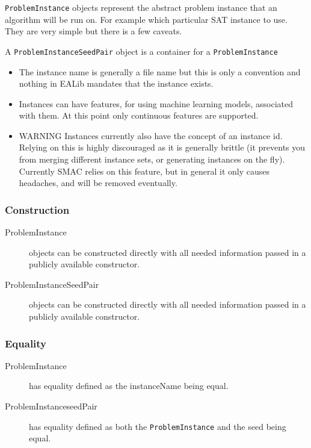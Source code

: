 \documentclass[11pt,letterpaper,oneside]{article}
\begin{document}
\texttt{ProblemInstance} objects represent the abstract problem instance that an algorithm will be run on. For example which particular SAT instance to use. They are very simple but there is a few caveats.

A \texttt{ProblemInstanceSeedPair} object is a container for a \texttt{ProblemInstance}




\begin{itemize}
\item The instance name is generally a file name but this is only a convention and nothing in EALib mandates that the instance exists.
\item Instances can have features, for using machine learning models, associated with them. At this point only continuous features are supported.
\item \textsc{WARNING} Instances currently also have the concept of an instance id. Relying on this is highly discouraged as it is generally brittle (it prevents you from merging different instance sets, or generating instances on the fly). Currently SMAC relies on this feature, but in general it only causes headaches, and will be removed eventually.

\end{itemize}

\subsubsection{Construction}
\begin{description}
\item[ProblemInstance] objects can be constructed directly with all needed information passed in a publicly available constructor.
\item[ProblemInstanceSeedPair] objects can be constructed directly with all needed information passed in a publicly available constructor.
\end{description}


\subsubsection{Equality}
\begin{description}
\item[ProblemInstance] has equality defined as the instanceName being equal.
\item[ProblemInstanceseedPair] has equality defined as both the \texttt{ProblemInstance} and the seed being equal.
\end{description}
\end{document}
